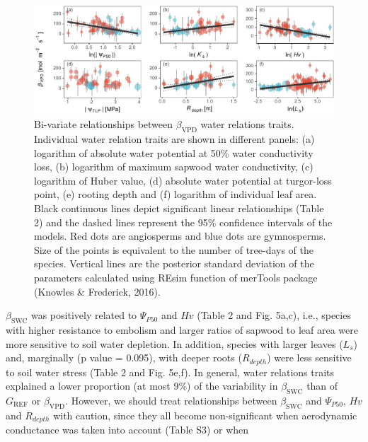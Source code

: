 \documentclass[11pt,twoside]{reedthesis}
\begin{document}
\begin{figure}[hbt!]

{\centering \includegraphics[width=1\linewidth]{figure/CH5/Figure_4} 

}

\caption[Bi-variate relationships between $\beta_{\text{VPD}}$ water relations traits.]{Bi-variate relationships between $\beta_{\text{VPD}}$ water relations traits. Individual water relation traits are shown in different panels: (a) logarithm of absolute water potential at 50\% water conductivity loss, (b) logarithm of maximum sapwood water conductivity, (c) logarithm of Huber value, (d) absolute water potential at turgor-loss point, (e) rooting depth and (f) logarithm of individual leaf area. Black continuous lines depict significant linear relationships (Table 2) and the dashed lines represent the 95\% confidence intervals of the models. Red dots are angiosperms and blue dots are gymnosperms. Size of the points is equivalent to the number of tree-days of the species. Vertical lines are the posterior standard deviation of the parameters calculated using REsim function of merTools package (Knowles \& Frederick, 2016).}\label{fig:ch5fig4}
\end{figure}
\(\beta_{\text{SWC}}\) was positively related to
\textbar{}\(\Psi_{P50}\)\textbar{} and \(Hv\) (Table 2 and Fig. 5a,c),
i.e., species with higher resistance to embolism and larger ratios of
sapwood to leaf area were more sensitive to soil water depletion. In
addition, species with larger leaves (\(L_s\)) and, marginally (p value
= 0.095), with deeper roots (\(R_{depth}\)) were less sensitive to soil
water stress (Table 2 and Fig. 5e,f). In general, water relations traits
explained a lower proportion (at most 9\%) of the variability in
\(\beta_{\text{SWC}}\) than of \(G_{\text{REF}}\) or
\(\beta_{\text{VPD}}\). However, we should treat relationships between
\(\beta_{\text{SWC}}\) and \textbar{}\(\Psi_{P50}\)\textbar{}, \(Hv\)
and \(R_{depth}\) with caution, since they all become non-significant
when aerodynamic conductance was taken into account (Table S3) or when
\end{document}
